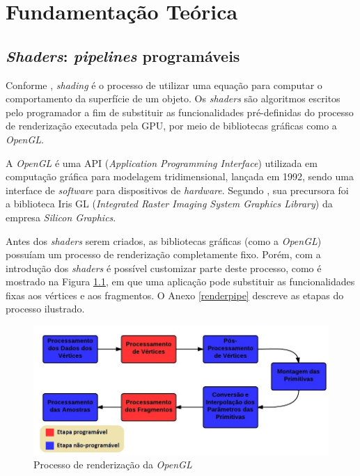 \chapter[Fundamentação Teórica]{Fundamentação Teórica}
\label{refteorico}

\section{\textit{Shaders}: \textit{pipelines} programáveis}

	Conforme \cite{realtime}, \textit{shading} é o processo de utilizar uma equação para computar o comportamento da superfície de um objeto. Os \textit{shaders} são algoritmos escritos pelo programador a fim de substituir as funcionalidades pré-definidas do processo de renderização executada pela GPU, por meio de bibliotecas gráficas como a \textit{OpenGL}.

	 A \textit{OpenGL} é uma API (\textit{Application Programming Interface}) utilizada em computação gráfica para modelagem tridimensional, lançada em 1992, sendo uma interface de \textit{software} para dispositivos de \textit{hardware}. Segundo \cite{opengl2011}, sua precursora foi a biblioteca Iris GL (\textit{Integrated Raster Imaging System Graphics Library}) da empresa \textit{Silicon Graphics}.

	Antes dos \textit{shaders} serem criados, as bibliotecas gráficas (como a \textit{OpenGL}) possuíam um processo de renderização completamente fixo. Porém, com a introdução dos \textit{shaders} é possível customizar parte deste processo, como é  mostrado na Figura \ref{pipeline}, em que uma aplicação pode substituir as funcionalidades fixas aos vértices e aos fragmentos. O Anexo \ref{renderpipe} descreve as etapas do processo ilustrado.
	\begin{figure}[ht]
	\centering
		\includegraphics[keepaspectratio=true,scale=0.5]{figuras/pipeline.jpg}
	\caption{Processo de renderização da \textit{OpenGL}}
	\label{pipeline}
	\end{figure}

